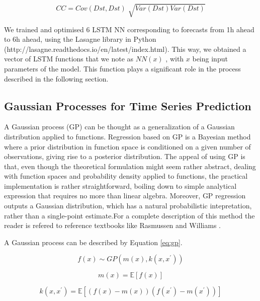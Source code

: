 \begin{equation}\label{eq:cc}
 CC=Cov \left( Dst,Dst \right) \sqrt[]{Var \left( Dst \right) Var \left( Dst \right) }
\end{equation}


We trained and optimised 6 LSTM NN corresponding to forecasts from 1h ahead to 6h ahead, using the 
Lasagne library in Python (http://lasagne.readthedocs.io/en/latest/index.html). This way, we obtained a 
vector of LSTM functions that we note as  \( NN \left( x \right)  \) , with  \( x \)  being input parameters 
of the model. This function plays a significant role in the process described in the following section. 


\subsection{Gaussian Processes for Time Series Prediction}

 A Gaussian process (GP) can be thought as a generalization of a Gaussian distribution applied to functions. 
 Regression based on GP is a Bayesian method where a prior distribution in function space is conditioned on a 
 given number of observations, giving rise to a posterior distribution. The appeal of using GP is that, even 
 though the theoretical formulation might seem rather abstract, dealing with function spaces and probability 
 density applied to functions, the practical implementation is rather straightforward, boiling down to simple 
 analytical expression that requires no more than linear algebra. Moreover, GP regression outputs a Gaussian 
 distribution, which has a natural probabilistic intepretation, rather than a single-point estimate.For a complete 
 description of this method the reader is refered to reference textbooks like Rasmussen and Williams 
 \citet{Rasmussen:2005:GPM:1162254}. 

A Gaussian process can be described by Equation \ref{eq:gp}. 

\begin{equation}\label{eq:gp}
 f \left( x \right)  \sim  GP \left( m \left( x \right) , k \left( x,x^{'} \right)  \right) 
\end{equation}

\begin{equation}\label{eq:meanfunc}
 m \left( x \right) = \mathbb{E} \left[ f \left( x \right)  \right]
\end{equation}

\begin{equation}\label{eq:kernelfunc}
 k ( x,x^{'}) = \mathbb{E} \left[  \left( f \left( x \right) -m \left( x \right)  \right)  ( f ( x^{'} ) -m ( x^{'}) )  \right]
\end{equation}


